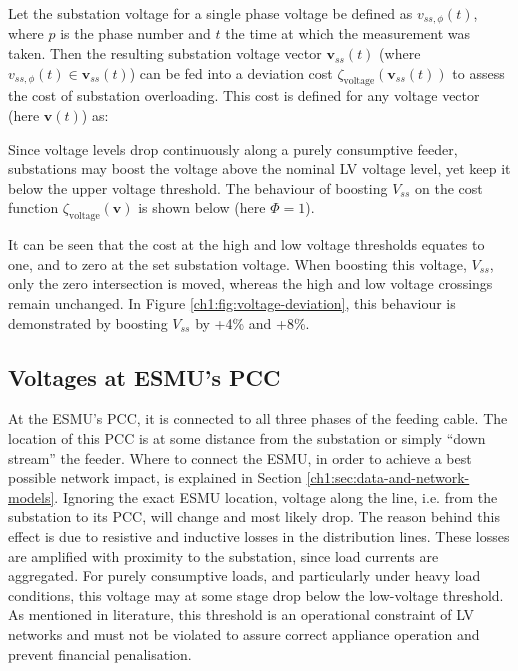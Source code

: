 Let the substation voltage for a single phase voltage be defined as $v_{ss,\phi}(t)$, where $p$ is the phase number and $t$ the time at which the measurement was taken.
Then the resulting substation voltage vector $\textbf{v}_{ss}(t)$ (where $v_{ss,\phi}(t) \in \textbf{v}_{ss}(t)$) can be fed into a deviation cost $\zeta_\text{voltage}(\textbf{v}_{ss}(t))$ to assess the cost of substation overloading.
This cost is defined for any voltage vector (here $\textbf{v}(t)$) as:



Since voltage levels drop continuously along a purely consumptive feeder, substations may boost the voltage above the nominal LV voltage level, yet keep it below the upper voltage threshold.
The behaviour of boosting $V_{ss}$ on the cost function $\zeta_\text{voltage}(\textbf{v})$ is shown below (here $\Phi = 1$).



It can be seen that the cost at the high and low voltage thresholds equates to one, and to zero at the set substation voltage.
When boosting this voltage, $V_{ss}$, only the zero intersection is moved, whereas the high and low voltage crossings remain unchanged.
In Figure \ref{ch1:fig:voltage-deviation}, this behaviour is demonstrated by boosting $V_{ss}$ by +4\% and +8\%.

\subsection{Voltages at ESMU's PCC}
\label{ch1:subsec:voltages-at-esmu}

At the ESMU's PCC, it is connected to all three phases of the feeding cable.
The location of this PCC is at some distance from the substation or simply ``down stream'' the feeder.
Where to connect the ESMU, in order to achieve a best possible network impact, is explained in Section \ref{ch1:sec:data-and-network-models}.
Ignoring the exact ESMU location, voltage along the line, i.e. from the substation to its PCC, will change and most likely drop.
The reason behind this effect is due to resistive and inductive losses in the distribution lines.
These losses are amplified with proximity to the substation, since load currents are aggregated.
For purely consumptive loads, and particularly under heavy load conditions, this voltage may at some stage drop below the low-voltage threshold.
As mentioned in literature, this threshold is an operational constraint of LV networks and must not be violated to assure correct appliance operation and prevent financial penalisation.

